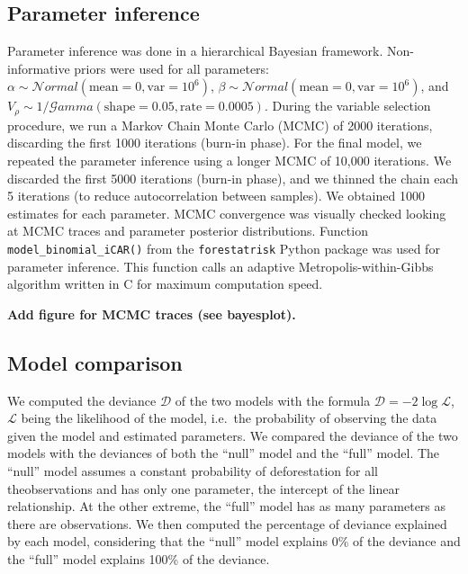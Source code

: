 \documentclass[12pt,]{article}
\begin{document}
\hypertarget{parameter-inference}{%
\subsection{Parameter inference}\label{parameter-inference}}

Parameter inference was done in a hierarchical Bayesian framework. Non-informative priors were used for all parameters: \(\alpha \sim \mathcal{N}ormal(\text{mean}=0,\text{var}=10^6)\), \(\beta \sim \mathcal{N}ormal(\text{mean}=0,\text{var}=10^6)\), and \(V_{\rho} \sim 1/\mathcal{G}amma(\text{shape}=0.05,\text{rate}=0.0005)\). During the variable selection procedure, we run a Markov Chain Monte Carlo (MCMC) of 2000 iterations, discarding the first 1000 iterations (burn-in phase). For the final model, we repeated the parameter inference using a longer MCMC of 10,000 iterations. We discarded the first 5000 iterations (burn-in phase), and we thinned the chain each 5 iterations (to reduce autocorrelation between samples). We obtained 1000 estimates for each parameter. MCMC convergence was visually checked looking at MCMC traces and parameter posterior distributions. Function \texttt{model\_binomial\_iCAR()} from the \texttt{forestatrisk} Python package was used for parameter inference. This function calls an adaptive Metropolis-within-Gibbs algorithm \citep{Rosenthal2011} written in C for maximum computation speed.

\textbf{Add figure for MCMC traces (see bayesplot).}

\hypertarget{model-comparison}{%
\subsection{Model comparison}\label{model-comparison}}

We computed the deviance \(\mathcal{D}\) of the two models with the formula \(\mathcal{D}=-2 \log \mathcal{L}\), \(\mathcal{L}\) being the likelihood of the model, i.e.~the probability of observing the data given the model and estimated parameters. We compared the deviance of the two models with the deviances of both the ``null'' model and the ``full'' model. The ``null'' model assumes a constant probability of deforestation for all theobservations and has only one parameter, the intercept of the linear relationship. At the other extreme, the ``full'' model has as many parameters as there are observations. We then computed the percentage of deviance explained by each model, considering that the ``null'' model explains 0\% of the deviance and the ``full'' model explains 100\% of the deviance.
\end{document}
